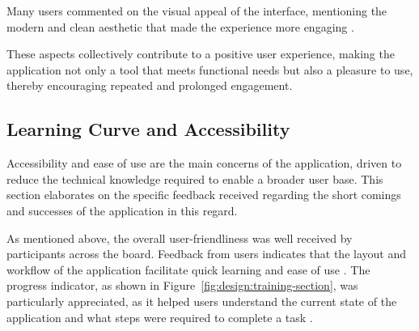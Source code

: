 Many users commented on the visual appeal of the interface, mentioning the modern and clean aesthetic that made the experience more engaging \cite{P7, P8, P10}. 


These aspects collectively contribute to a positive user experience, making the application not only a tool that meets functional needs but also a pleasure to use, thereby encouraging repeated and prolonged engagement.

\subsection*{Learning Curve and Accessibility}
\label{sec:results:learning_curve_accessibility}

Accessibility and ease of use are the main concerns of the application, driven to reduce the technical knowledge required to enable a broader user base.
This section elaborates on the specific feedback received regarding the short comings and successes of the application in this regard.

As mentioned above, the overall user-friendliness was well received by participants across the board.
Feedback from users indicates that the layout and workflow of the application facilitate quick learning and ease of use \cite{P4, P5, P7, P8, P10}.
The progress indicator, as shown in Figure~\ref{fig:design:training-section}, was particularly appreciated, as it helped users understand the current state of the application and what steps were required to complete a task \cite{P5, P7, P8, P9}.



